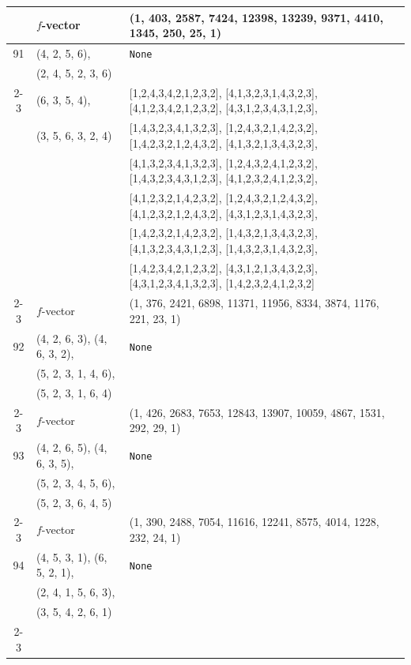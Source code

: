 \documentclass[10pt]{amsart}
\numberwithin{equation}{section}
\theoremstyle{plain}
\theoremstyle{definition}
\theoremstyle{remark}
\begin{document}
{\begin{longtable}{c|l|l}
		& $f$-vector & {(1, 403, 2587, 7424, 12398, 13239, 9371, 4410, 1345, 250, 25, 1)} \\
		\midrule
		
		91 & (4, 2, 5, 6), & \texttt{None} \\
		& (2, 4, 5, 2, 3, 6) &  \\ \cline{2-3}
		
		& (6, 3, 5, 4), & [1,2,4,3,4,2,1,2,3,2], [4,1,3,2,3,1,4,3,2,3], [4,1,2,3,4,2,1,2,3,2], [4,3,1,2,3,4,3,1,2,3], \\
		& (3, 5, 6, 3, 2, 4) & [1,4,3,2,3,4,1,3,2,3], [1,2,4,3,2,1,4,2,3,2], [1,4,2,3,2,1,2,4,3,2], [4,1,3,2,1,3,4,3,2,3], \\
		&  & [4,1,3,2,3,4,1,3,2,3], [1,2,4,3,2,4,1,2,3,2], [1,4,3,2,3,4,3,1,2,3], [4,1,2,3,2,4,1,2,3,2], \\
		&  & [4,1,2,3,2,1,4,2,3,2], [1,2,4,3,2,1,2,4,3,2], [4,1,2,3,2,1,2,4,3,2], [4,3,1,2,3,1,4,3,2,3], \\
		&  & [1,4,2,3,2,1,4,2,3,2], [1,4,3,2,1,3,4,3,2,3], [4,1,3,2,3,4,3,1,2,3], [1,4,3,2,3,1,4,3,2,3], \\
		&  & [1,4,2,3,4,2,1,2,3,2], [4,3,1,2,1,3,4,3,2,3], [4,3,1,2,3,4,1,3,2,3], [1,4,2,3,2,4,1,2,3,2] \\ \cline{2-3}
		
		& $f$-vector & {(1, 376, 2421, 6898, 11371, 11956, 8334, 3874, 1176, 221, 23, 1)} \\
		\midrule
		
		92 & (4, 2, 6, 3), (4, 6, 3, 2), & \texttt{None} \\
		& (5, 2, 3, 1, 4, 6), &  \\
		& (5, 2, 3, 1, 6, 4) &  \\ \cline{2-3}
		
		& $f$-vector & {(1, 426, 2683, 7653, 12843, 13907, 10059, 4867, 1531, 292, 29, 1)} \\
		\midrule
		
		93 & (4, 2, 6, 5), (4, 6, 3, 5), & \texttt{None} \\
		& (5, 2, 3, 4, 5, 6), &  \\
		& (5, 2, 3, 6, 4, 5) &  \\ \cline{2-3}
		
		& $f$-vector & {(1, 390, 2488, 7054, 11616, 12241, 8575, 4014, 1228, 232, 24, 1)} \\
		\midrule
		
		94 & (4, 5, 3, 1), (6, 5, 2, 1), & \texttt{None} \\
		& (2, 4, 1, 5, 6, 3), &  \\
		& (3, 5, 4, 2, 6, 1) &  \\ \cline{2-3}
		

\end{longtable}}
\end{document}
